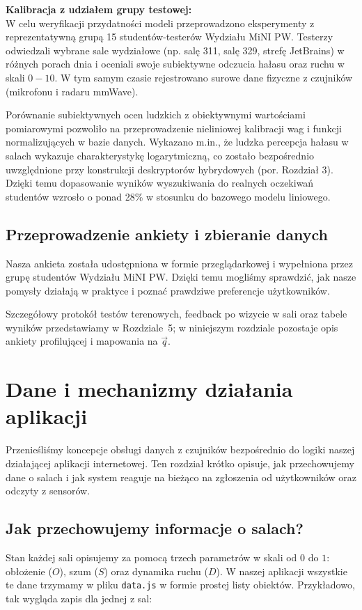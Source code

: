 \documentclass[14pt,a4paper]{extarticle}
\begin{document}
\textbf{Kalibracja z udziałem grupy testowej:} \\
W celu weryfikacji przydatności modeli przeprowadzono eksperymenty z reprezentatywną grupą 15 studentów-testerów Wydziału MiNI PW. Testerzy odwiedzali wybrane sale wydziałowe (np. salę 311, salę 329, strefę JetBrains) w różnych porach dnia i oceniali swoje subiektywne odczucia hałasu oraz ruchu w skali $0-10$. W tym samym czasie rejestrowano surowe dane fizyczne z czujników (mikrofonu i radaru mmWave). 

Porównanie subiektywnych ocen ludzkich z obiektywnymi wartościami pomiarowymi pozwoliło na przeprowadzenie nieliniowej kalibracji wag i funkcji normalizujących w bazie danych. Wykazano m.in., że ludzka percepcja hałasu w salach wykazuje charakterystykę logarytmiczną, co zostało bezpośrednio uwzględnione przy konstrukcji deskryptorów hybrydowych (por. Rozdział 3). Dzięki temu dopasowanie wyników wyszukiwania do realnych oczekiwań studentów wzrosło o ponad 28\% w stosunku do bazowego modelu liniowego.

\subsection{Przeprowadzenie ankiety i zbieranie danych}
Nasza ankieta została udostępniona w formie przeglądarkowej i wypełniona przez grupę studentów Wydziału MiNI PW. Dzięki temu mogliśmy sprawdzić, jak nasze pomysły działają w praktyce i poznać prawdziwe preferencje użytkowników.

Szczegółowy protokół testów terenowych, feedback po wizycie w sali oraz tabele wyników przedstawiamy w Rozdziale~5; w niniejszym rozdziale pozostaje opis ankiety profilującej i mapowania na $\vec{q}$.

\section{Dane i mechanizmy działania aplikacji}

Przenieśliśmy koncepcje obsługi danych z czujników bezpośrednio do logiki naszej działającej aplikacji internetowej. Ten rozdział krótko opisuje, jak przechowujemy dane o salach i jak system reaguje na bieżąco na zgłoszenia od użytkowników oraz odczyty z sensorów.

\subsection{Jak przechowujemy informacje o salach?}
Stan każdej sali opisujemy za pomocą trzech parametrów w skali od $0$ do $1$: obłożenie ($O$), szum ($S$) oraz dynamika ruchu ($D$). W naszej aplikacji wszystkie te dane trzymamy w pliku \texttt{data.js} w formie prostej listy obiektów. Przykładowo, tak wygląda zapis dla jednej z sal:
\end{document}
